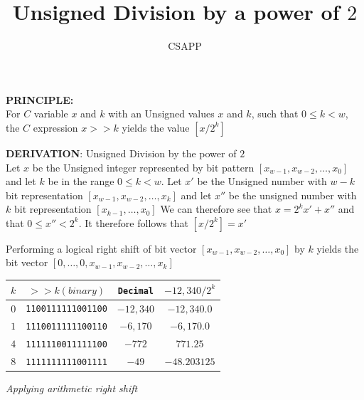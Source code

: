 \documentclass{article}
\title{Unsigned Division by a power of $2$}
\author{CSAPP}
\begin{document}
    \maketitle
    \begin{flushleft}
        \textbf{\small PRINCIPLE:}\\
        For $C$ variable $x$ and $k$ with an Unsigned values $x$ and $k$, such that
        $0 \leq k < w$, the $C$ expression $x>>k$ yields the value $[x/2^k]$

        \textbf{\small DERIVATION}: Unsigned Division by the power of $2$\\
        Let $x$ be the Unsigned integer represented by bit pattern 
        $[x_{w-1},x_{w-2}, \ldots, x_0]$ and let $k$ be in the range $0\leq k < w$. Let
        $x'$ be the Unsigned number with $w-k$ bit representation $[x_{w-1}, x_{w-2},\ldots, x_k]$ and 
        let $x''$ be the unsigned number with $k$ bit representation $[x_{k-1},\ldots, x_0]$ We can 
        therefore see that $x=2^kx' + x''$ and that $0 \leq x'' < 2^k$. It therefore follows that
        $[x/2^k] = x'$
        \bigskip

        \begin{center}
           Performing a logical right shift of bit vector $[x_{w-1}, x_{w-2},\ldots,x_0]$ by $k$ yields
           the bit vector $[0,\ldots,0,x_{w-1}, x_{w-2},\ldots, x_k]$
           \smallbreak
            \begin{tabular}{cccc}
                \toprule
                $k$     & $>>k(binary)$     & \texttt{Decimal}  & $-12,340/2^k$\\
                \midrule
                $0$     & \texttt{1100111111001100} & $-12,340$ & $-12,340.0$\\
                $1$     & \texttt{1110011111100110} & $-6,170$  & $-6,170.0$\\
                $4$     & \texttt{1111110011111100} & $-772$    & $771.25$\\
                $8$     & \texttt{1111111111001111} & $-49$     & $-48.203125$\\
                \bottomrule
            \end{tabular}
              \bigskip

            \textit{Applying  arithmetic right shift}
        \end{center}
        

    \end{flushleft}
\end{document}
